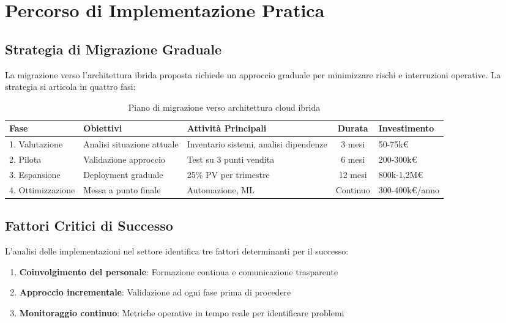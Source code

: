 \section{Percorso di Implementazione Pratica}
\label{sec:implementazione}

\subsection{Strategia di Migrazione Graduale}
\label{subsec:migrazione-graduale}

La migrazione verso l'architettura ibrida proposta richiede un approccio graduale per minimizzare rischi e interruzioni operative. La strategia si articola in quattro fasi:

\begin{table}[htbp]
\centering
\caption{Piano di migrazione verso architettura cloud ibrida}
\label{tab:roadmap-migrazione}
\begin{tabular}{p{2cm}p{4cm}p{3cm}cp{2cm}}
\toprule
\textbf{Fase} & \textbf{Obiettivi} & \textbf{Attività Principali} & \textbf{Durata} & \textbf{Investimento} \\
\midrule
1. Valutazione & Analisi situazione attuale & Inventario sistemi, analisi dipendenze & 3 mesi & 50-75k€ \\
2. Pilota & Validazione approccio & Test su 3 punti vendita & 6 mesi & 200-300k€ \\
3. Espansione & Deployment graduale & 25\% PV per trimestre & 12 mesi & 800k-1,2M€ \\
4. Ottimizzazione & Messa a punto finale & Automazione, ML & Continuo & 300-400k€/anno \\
\bottomrule
\end{tabular}
\end{table}

\subsection{Fattori Critici di Successo}
\label{subsec:fattori-successo}

L'analisi delle implementazioni nel settore identifica tre fattori determinanti per il successo:

\begin{enumerate}
    \item \textbf{Coinvolgimento del personale}: Formazione continua e comunicazione trasparente
    \item \textbf{Approccio incrementale}: Validazione ad ogni fase prima di procedere
    \item \textbf{Monitoraggio continuo}: Metriche operative in tempo reale per identificare problemi
\end{enumerate}

